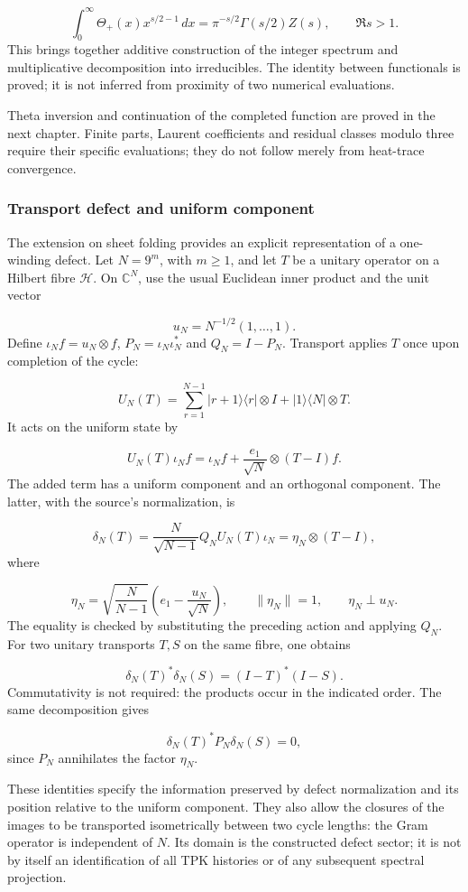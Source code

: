 \[
\int_0^\infty\Theta_+(x)x^{s/2-1}\,dx
=\pi^{-s/2}\Gamma(s/2)Z(s),\qquad \Re s>1.
\]
This brings together additive construction of the integer spectrum and multiplicative decomposition into irreducibles. The identity between functionals is proved; it is not inferred from proximity of two numerical evaluations.

Theta inversion and continuation of the completed function are proved in the next chapter. Finite parts, Laurent coefficients and residual classes modulo three require their specific evaluations; they do not follow merely from heat-trace convergence.

\subsubsection*{Transport defect and uniform component}
The extension on sheet folding provides an explicit representation of a one-winding defect. Let \(N=9^m\), with \(m\ge1\), and let \(T\) be a unitary operator on a Hilbert fibre \(\mathcal H\). On \(\mathbb C^N\), use the usual Euclidean inner product and the unit vector

\[
u_N=N^{-1/2}(1,\ldots,1).
\]
Define \(\iota_Nf=u_N\otimes f\), \(P_N=\iota_N\iota_N^*\) and \(Q_N=I-P_N\). Transport applies \(T\) once upon completion of the cycle:

\[
U_N(T)=\sum_{r=1}^{N-1}|r+1\rangle\langle r|\otimes I
+|1\rangle\langle N|\otimes T.
\]
It acts on the uniform state by

\[
U_N(T)\iota_N f
=\iota_N f+\frac{e_1}{\sqrt N}\otimes(T-I)f.
\]
The added term has a uniform component and an orthogonal component. The latter, with the source's normalization, is

\[
\delta_N(T)=\frac{N}{\sqrt{N-1}}Q_NU_N(T)\iota_N
=\eta_N\otimes(T-I),
\]
where

\[
\eta_N=\sqrt{\frac N{N-1}}\left(e_1-\frac{u_N}{\sqrt N}\right),
\qquad \|\eta_N\|=1,\qquad \eta_N\perp u_N.
\]
The equality is checked by substituting the preceding action and applying \(Q_N\). For two unitary transports \(T,S\) on the same fibre, one obtains

\[
\delta_N(T)^*\delta_N(S)=(I-T)^*(I-S).
\]
Commutativity is not required: the products occur in the indicated order. The same decomposition gives

\[
\delta_N(T)^*P_N\delta_N(S)=0,
\]
since \(P_N\) annihilates the factor \(\eta_N\).

These identities specify the information preserved by defect normalization and its position relative to the uniform component. They also allow the closures of the images to be transported isometrically between two cycle lengths: the Gram operator is independent of \(N\). Its domain is the constructed defect sector; it is not by itself an identification of all TPK histories or of any subsequent spectral projection.

